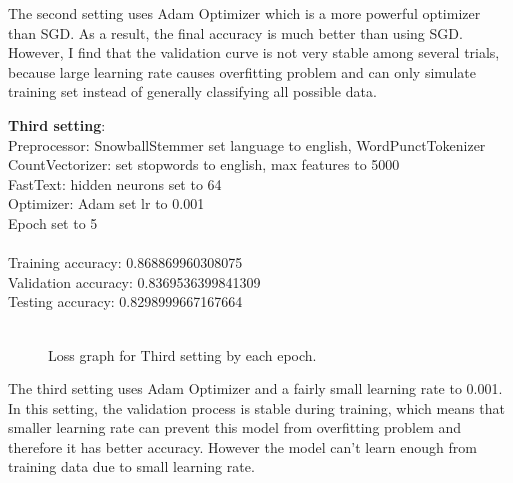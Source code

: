 \documentclass{article} %
\begin{document}
The second setting uses Adam Optimizer which is a more powerful optimizer than SGD. As a result, the final accuracy is much better than using SGD. However, 
I find that the validation curve is not very stable among several trials, because large learning rate causes overfitting problem and can only simulate training set
instead of generally classifying all possible data.

\newpage
\noindent
\textbf{Third setting}:\\
Preprocessor: SnowballStemmer set language to english, WordPunctTokenizer\\
CountVectorizer: set stopwords to english, max features to 5000\\
FastText: hidden neurons set to 64\\
Optimizer: Adam set lr to 0.001\\
Epoch set to 5\\
\\
\noindent
Training accuracy: 0.868869960308075\\
Validation accuracy: 0.8369536399841309\\
Testing accuracy: 0.8298999667167664\\
\begin{figure}[htp]
    \centering
    \\
Loss graph for Third setting by each epoch.   
    \end{figure}

The third setting uses Adam Optimizer and a fairly small learning rate to 0.001. In this setting, the validation process is stable during training, which means that smaller learning rate can prevent this model from overfitting problem and therefore it has better accuracy. However the model can't learn enough from training data due to small learning rate.
\end{document}
